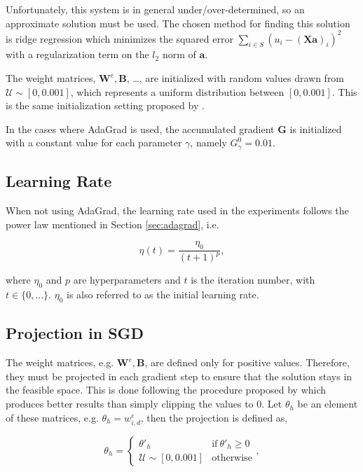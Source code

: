 Unfortunately, this system is in general under/over-determined, so an approximate solution must be used. The chosen method for finding this solution is ridge regression which minimizes the squared error $\sum_{i \in S}(u_{i} - (\mathbf{X}\mathbf{a})_{i})^{2}$ with a regularization term on the $l_{2}$ norm of $\mathbf{a}$.

The weight matrices, $\mathbf{W}^{e}, \mathbf{B}$, \dots, are initialized with random values drawn from $\mathcal{U} \sim [0, 0.001]$, which represents a uniform distribution between $[0, 0.001]$. This is the same initialization setting proposed by \citet{tschiatschek16learning}.

In the cases where AdaGrad is used, the accumulated gradient $\mathbf{G}$ is initialized with a constant value for each parameter $\gamma$, namely $G^{0}_{\gamma} = 0.01$.

\subsection{Learning Rate}

When not using AdaGrad, the learning rate used in the experiments follows the power law mentioned in Section \ref{sec:adagrad}, i.e.

\begin{equation}
  \eta(t) = \frac{\eta_{0}}{(t+1)^{p}},
\end{equation}

where $\eta_{0}$ and $p$ are hyperparameters and $t$ is the iteration number, with $t \in \{0,\dots\}$. $\eta_{0}$ is also referred to as the initial learning rate.

\subsection{Projection in SGD}

The weight matrices, e.g. $\mathbf{W}^{e}, \mathbf{B}$, are defined only for positive values. Therefore, they must be projected in each gradient step to ensure that the solution stays in the feasible space. This is done following the procedure proposed by \citet{tschiatschek16learning} which produces better results than simply clipping the values to 0. Let $\theta_{h}$ be an element of these matrices, e.g. $\theta_{h} = w^{e}_{i,d}$, then the projection is defined as,

\begin{equation}
  \theta_{h} = \begin{cases}
    \theta'_{h} & \text{if}\ \theta'_{h} \geq 0 \\
    \mathcal{U} \sim [0, 0.001] & \text{otherwise}
  \end{cases},
\end{equation}

